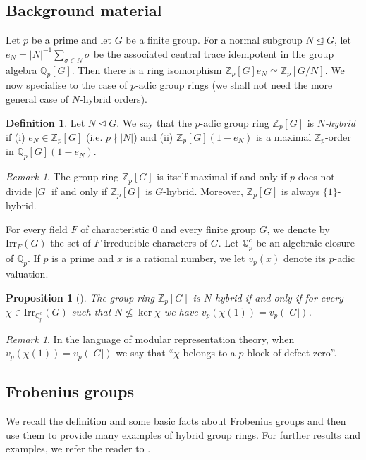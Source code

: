 \documentclass[12pt]{amsart}
\theoremstyle{plain}
\newtheorem{prop}[theorem]{Proposition}
\theoremstyle{remark}
\newtheorem{remark}[theorem]{Remark}
\theoremstyle{definition}
\newtheorem{definition}[theorem]{Definition}
\numberwithin{equation}{section}
\begin{document}
\subsection{Background material}
Let $p$ be a prime and let $G$ be a finite group.
For a normal subgroup $N \unlhd G$, let $e_{N} = |N|^{-1}\sum_{\sigma \in N} \sigma$
be the associated central trace idempotent in the group algebra ${\mathbb{Q}}_{p}[G]$.
Then there is a ring isomorphism ${\mathbb{Z}}_{p}[G]e_{N} \simeq {\mathbb{Z}}_{p}[G/N]$.
We now specialise \cite[Definition 2.5]{hybrid-ETNC} to the case of $p$-adic group rings
(we shall not need the more general case of $N$-hybrid orders).

\begin{definition}
Let $N \unlhd G$. We say that the $p$-adic group ring ${\mathbb{Z}}_{p}[G]$ is \emph{$N$-hybrid}
if (i) $e_{N} \in {\mathbb{Z}}_{p}[G]$ (i.e. $p \nmid |N|$) and (ii) ${\mathbb{Z}}_{p}[G](1-e_{N})$ is a maximal
${\mathbb{Z}}_{p}$-order in ${\mathbb{Q}}_{p}[G](1-e_{N})$.
\end{definition}

\begin{remark}
The group ring ${\mathbb{Z}}_{p}[G]$ is itself maximal if and only if $p$ does not divide $|G|$
if and only if ${\mathbb{Z}}_{p}[G]$ is $G$-hybrid. Moreover, ${\mathbb{Z}}_{p}[G]$ is always $\{1\}$-hybrid.
\end{remark}

For every field $F$ of characteristic $0$ and every finite group $G$, we denote by ${\mathrm{Irr}}_{F}(G)$
the set of $F$-irreducible characters of $G$.
Let ${\mathbb{Q}}_{p}^{c}$ be an algebraic closure of ${\mathbb{Q}}_{p}$.
If $p$ is a prime and $x$ is a rational number, we let $v_{p}(x)$ denote its $p$-adic valuation.

\begin{prop}[{\cite[Proposition 2.7]{hybrid-ETNC}}]\label{prop:hybrid-criterion-groupring}
The group ring ${\mathbb{Z}}_{p}[G]$ is $N$-hybrid if and only if
for every $\chi \in {\mathrm{Irr}}_{{\mathbb{Q}}_{p}^{c}}(G)$ such that $N \not \leq \ker \chi$
we have $v_{p}(\chi(1))=v_{p}(|G|)$.
\end{prop}

\begin{remark}
In the language of modular representation theory, when $v_{p}(\chi(1))=v_{p}(|G|)$
we say that ``$\chi$ belongs to a $p$-block of defect zero''.
\end{remark}

\subsection{Frobenius groups}\label{subsec:frobenius-groups}
We recall the definition and some basic facts about Frobenius groups and then use them to
provide many examples of hybrid group rings.
For further results and examples, we refer the reader to \cite[\S 2.3]{hybrid-ETNC}.
\end{document}
